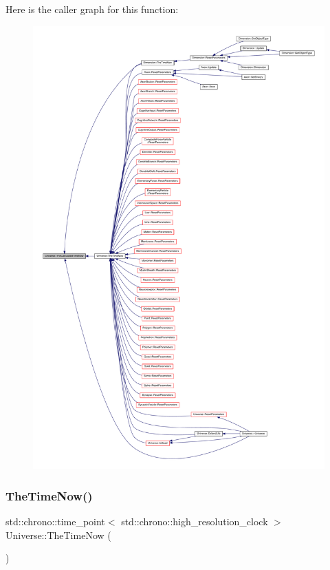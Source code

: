 Here is the caller graph for this function\+:
\nopagebreak
\begin{figure}[H]
\begin{center}
\leavevmode
\includegraphics[width=350pt]{class_universe_aa220508c4cc12b02c6fe494622ebb58d_icgraph}
\end{center}
\end{figure}
\mbox{\label{class_universe_ae54d34c5d695917e074b8e07e8820bdb}} 
\subsubsection{\texorpdfstring{The\+Time\+Now()}{TheTimeNow()}}
{\footnotesize\ttfamily std\+::chrono\+::time\+\_\+point$<$ std\+::chrono\+::high\+\_\+resolution\+\_\+clock $>$ Universe\+::\+The\+Time\+Now (\begin{DoxyParamCaption}{ }\end{DoxyParamCaption})}



